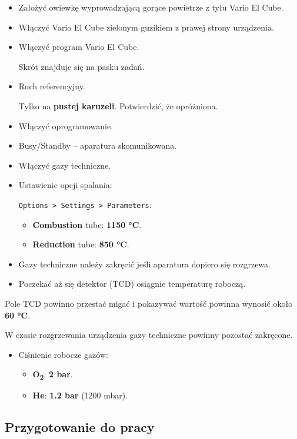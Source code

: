\documentclass[
  letterpaper,
  DIV=11,
  numbers=noendperiod]{scrreprt}
\begin{document}
\begin{itemize}
\item
  Założyć owiewkę wyprowadzającą gorące powietrze z tyłu Vario El Cube.
\item
  Włączyć Vario El Cube zielonym guzikiem z prawej strony urządzenia.
\item
  Włączyć program Vario El Cube.

  Skrót znajduje się na pasku zadań.
\item
  Ruch referencyjny.

  Tylko na \textbf{pustej karuzeli}. Potwierdzić, że opróżniona.
\item
  Włączyć oprogramowanie.
\item
  Busy/Standby -- aparatura skomunikowana.
\item
  Włączyć gazy techniczne.
\item
  Ustawienie opcji spalania:

  \texttt{Options\ \textgreater{}\ Settings\ \textgreater{}\ Parameters}:

  \begin{itemize}
  \item
    \textbf{Combustion} tube: \textbf{1150 °C}.
  \item
    \textbf{Reduction} tube: \textbf{850 °C}.
  \end{itemize}
\item
  Gazy techniczne należy zakręcić jeśli aparatura dopiero się rozgrzewa.
\item
  Poczekać aż się detektor (TCD) osiągnie temperaturę roboczą.
\end{itemize}

Pole TCD powinno przestać migać i pokazywać wartość powinna wynosić
około \textbf{60 °C}.

W czasie rozgrzewania urządzenia gazy techniczne powinny pozostać
zakręcone.

\begin{itemize}
\item
  Ciśnienie robocze gazów:

  \begin{itemize}
  \item
    \textbf{O\textsubscript{2}}: \textbf{2 bar}.
  \item
    \textbf{He}: \textbf{1.2 bar} (1200 mbar).
  \end{itemize}
\end{itemize}

\hypertarget{przygotowanie-do-pracy-1}{%
\subsection{Przygotowanie do pracy}\label{przygotowanie-do-pracy-1}}
\end{document}
